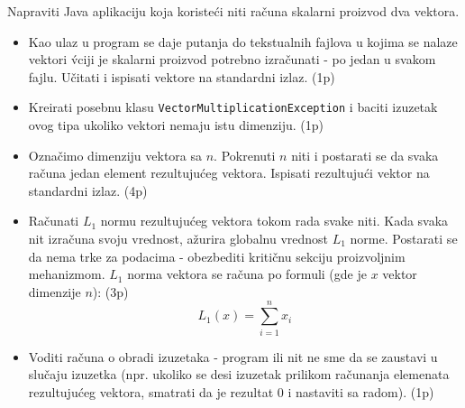 \documentclass[]{article}
\begin{document}
\begin{enumerate}
  Napraviti Java aplikaciju koja koriste\'c{}i niti ra\v{c}una skalarni proizvod dva vektora.
  \begin{itemize}
    \item Kao ulaz u program se daje putanja do tekstualnih fajlova u kojima se nalaze vektori \'v{c}iji je skalarni proizvod potrebno izra\v{c}unati - po jedan u svakom fajlu. U\v{c}itati i ispisati vektore na standardni izlaz. \hfill (1p)
    \item Kreirati posebnu klasu \texttt{VectorMultiplicationException} i baciti izuzetak ovog tipa ukoliko vektori nemaju istu dimenziju. \hfill (1p)
    \item Ozna\v{c}imo dimenziju vektora sa $n$. Pokrenuti $n$ niti i postarati se da svaka ra\v{c}una jedan element rezultuju\'c{}eg vektora. Ispisati rezultuju\'c{}i vektor na standardni izlaz. \hfill (4p)
    \item Ra\v{c}unati $L_{1}$ normu rezultuju\'c{}eg vektora tokom rada svake niti. Kada svaka nit izra\v{c}una svoju vrednost, a\v{z}urira globalnu vrednost $L_{1}$ norme. Postarati se da nema trke za podacima - obezbediti kriti\v{c}nu sekciju proizvoljnim mehanizmom. $L_{1}$ norma vektora se ra\v{c}una po formuli (gde je $x$ vektor dimenzije $n$):  \hfill (3p) $$L_{1}(x) = \sum_{i=1}^{n}{x_{i}}$$ 
    \item Voditi ra\v{c}una o obradi izuzetaka - program ili nit ne sme da se zaustavi u slu\v{c}aju izuzetka (npr. ukoliko se desi izuzetak prilikom ra\v{c}unanja elemenata rezultuju\'c{}eg vektora, smatrati da je rezultat $0$ i nastaviti sa radom). \hfill (1p)
  \end{itemize}


\end{enumerate}
\end{document}
